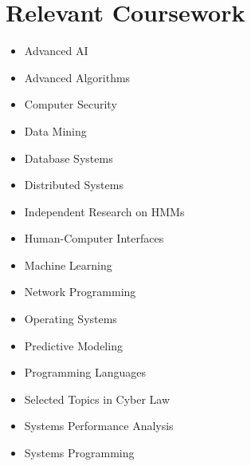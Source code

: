 \documentclass[11pt,a4paper,sans]{moderncv}        %
\begin{document}
\section{Relevant Coursework}

\begin{multicols}{3}
\begin{itemize}

\item Advanced AI
\item Advanced Algorithms
\item Computer Security
\item Data Mining
\item Database Systems
\item Distributed Systems
\item Independent Research on HMMs
\item Human-Computer Interfaces
\item Machine Learning
\item Network Programming
\item Operating Systems
\item Predictive Modeling
\item Programming Languages
\item Selected Topics in Cyber Law
\item Systems Performance Analysis
\item Systems Programming

\end{itemize}
\end{multicols}



\nocite{*}


\end{document}
